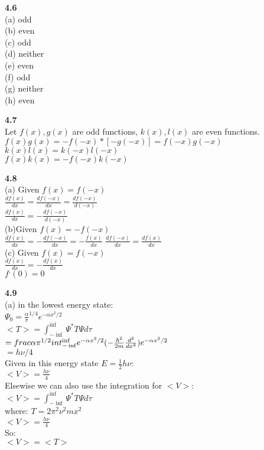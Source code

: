 \documentclass{article}
\begin{document}
\textbf{4.6}\\
(a) odd\\
(b) even\\
(c) odd\\
(d) neither\\
(e) even\\
(f) odd\\
(g) neither\\
(h) even\\
\newline

\textbf{4.7}\\
Let $f(x), g(x)$ are odd functions, $k(x), l(x)$ are even functions.\\
$f(x)g(x) = -f(-x)*[-g(-x)] = f(-x)g(-x)$\\
$k(x)l(x) = k(-x)l(-x)$\\
$f(x)k(x) = -f(-x)k(-x)$\\
\newline

\textbf{4.8}\\
(a) Given $f(x) = f(-x)$\\
$\frac{df(x)}{dx} = \frac{df(-x)}{dx} = \frac{df(-x)}{d(-x)}$\\
$\frac{df(x)}{dx} = -\frac{df(-x)}{d(-x)}$\\
(b)Given $f(x) = -f(-x)$\\
$\frac{df(x)}{dx} = -\frac{df(-x)}{dx} = -\frac{f(x)}{dx}$
$\frac{df(-x)}{dx} = \frac{df(x)}{dx}$\\
(c) Given $f(x) = f(-x)$\\
$\frac{df(x)}{dx} = -\frac{df(x)}{dx}$\\
$f^,(0) = 0$\\
\newline

\textbf{4.9}\\
(a) in the lowest energy state:\\
$\Psi_0 = \frac{\alpha}{\pi}^{1/4}e^{-\alpha x^2/2}$\\
$<T> = \int_{-\inf}^{\inf}\Psi^* T \Psi d\tau$\\
$=\\frac{\alpha}{\pi}^{1/2}int_{-\inf}^{\inf}e^{-\alpha x^2/2}(-\frac{\hbar^2}{2m}\frac{d^2}{dx^2})e^{-\alpha x^2/2}$\\
$=h\nu/4$\\
Given in this energy state $E = \frac{1}{2}h\nu$:\\
$<V> = \frac{h\nu}{4}$\\
Elsewise we can also use the integration for $<V>$:\\
$<V> = \int_{-\inf}^{\inf}\Psi^* T \Psi d\tau$\\
where: $T = 2\pi^2\nu^2mx^2$\\
$<V> = \frac{h\nu}{4}$\\
So:\\
$<V> = <T>$\\
\newline
\end{document}
